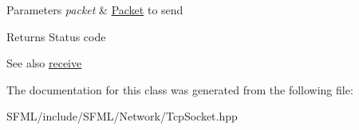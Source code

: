 \begin{DoxyParams}{Parameters}
{\em packet} & \mbox{\hyperlink{classsf_1_1_packet}{Packet}} to send\\
\hline
\end{DoxyParams}
\begin{DoxyReturn}{Returns}
Status code
\end{DoxyReturn}
\begin{DoxySeeAlso}{See also}
\mbox{\hyperlink{classsf_1_1_tcp_socket_a90ce50811ea61d4f00efc62bb99ae1af}{receive}} \begin{DoxyVerb}\end{DoxyVerb}
 
\end{DoxySeeAlso}


The documentation for this class was generated from the following file\+:\begin{DoxyCompactItemize}
\item 
S\+F\+M\+L/include/\+S\+F\+M\+L/\+Network/Tcp\+Socket.\+hpp\end{DoxyCompactItemize}
